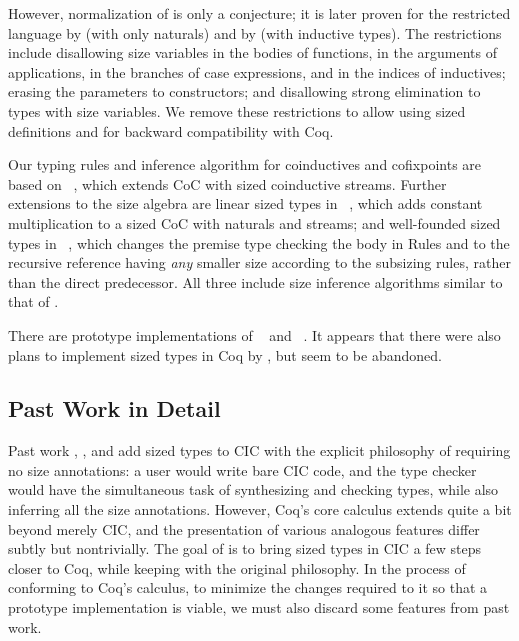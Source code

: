 However, normalization of \CIChat is only a conjecture; it is later proven for the restricted language \CIChatminus by \citet{cic-hat-minus-nat} (with only naturals) and by \citet{cic-hat-minus} (with inductive types).
The restrictions include disallowing size variables in the bodies of functions, in the arguments of applications, in the branches of case expressions, and in the indices of inductives; erasing the parameters to constructors; and disallowing strong elimination to types with size variables.
We remove these restrictions to allow using sized definitions and for backward compatibility with Coq.

Our typing rules and inference algorithm for coinductives and cofixpoints are based on \CChatomega~\citep{cc-hat-omega},
which extends CoC with sized coinductive streams.
Further extensions to the size algebra are linear sized types in \CIChatl~\citep{cic-hat-l},
which adds constant multiplication to a sized CoC with naturals and streams;
and well-founded sized types in \CIChatsub~\citep{wellfounded},
which changes the premise type checking the \cofixpoint body in Rules  and 
to the recursive reference having \emph{any} smaller size according to the subsizing rules,
rather than the direct predecessor.
All three include size inference algorithms similar to that of \CIChat.

There are prototype implementations of \CIChatminus~\citep{cicminus} and \CIChatsub~\citep{cic-wf}.
It appears that there were also plans to implement sized types in Coq by \citet{coq-hat}, but seem to be abandoned.

\subsection{Past Work in Detail}

Past work \CIChat, \CIChatminus, and \CChatomega add sized types to CIC with the explicit philosophy of requiring no size annotations:
a user would write bare CIC code, and the type checker would have the simultaneous task of synthesizing and checking types,
while also inferring all the size annotations.
However, Coq's core calculus extends quite a bit beyond merely CIC,
and the presentation of various analogous features differ subtly but nontrivially.
The goal of \lang is to bring sized types in CIC a few steps closer to Coq,
while keeping with the original philosophy.
In the process of conforming to Coq's calculus, to minimize the changes required to it so that a prototype implementation is
viable, we must also discard some features from past work.

